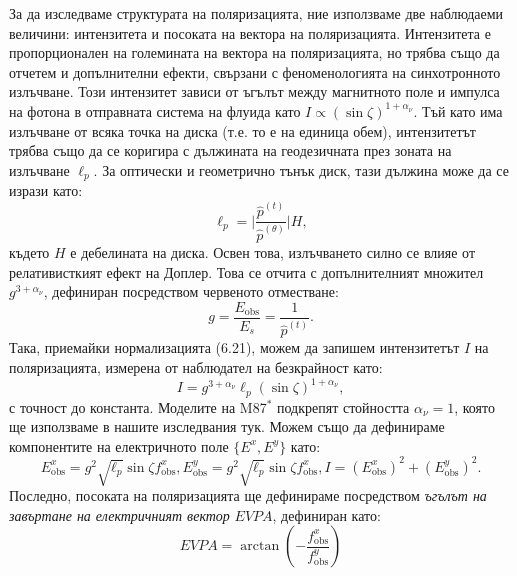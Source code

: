 За да изследваме структурата на поляризацията, ние използваме две наблюдаеми величини: интензитета и посоката на вектора на поляризацията. Интензитета е пропорционален на големината на вектора на поляризацията, но трябва също да отчетем и допълнителни ефекти, свързани с феноменологията на синхотронното излъчване. Този интензитет зависи от ъгълът между магнитното поле и импулса на фотона в отправната система на флуида като $I\propto(\sin\zeta)^{1 + \alpha_\nu}$. Тъй като има излъчване от всяка точка на диска (т.е. то е на единица обем), интензитетът трябва също да се коригира с дължината на геодезичната през зоната на излъчване $\ell_p$. За оптически и геометрично тънък диск, тази дължина може да се изрази като:
\begin{equation}
	\ell_p = \bigg\vert\frac{\hat{p}^{(t)}}{\hat{p}^{(\theta)}}\bigg\vert H,
\end{equation}
където $H$ е дебелината на диска. Освен това, излъчването силно се влияе от релативисткият ефект на Доплер. Това се отчита с допълнителният множител $g^{3 + \alpha_\nu}$, дефиниран посредством червеното отместване:
\begin{equation}
	g = \frac{E_\text{obs}}{E_s} = \frac{1}{\hat{p}^{(t)}}.
\end{equation}
Така, приемайки нормализацията (6.21), можем да запишем интензитетът $I$ на поляризацията, измерена от наблюдател на безкрайност като:
\begin{equation}
	I = g^{3 + \alpha_\nu}\ell_p(\sin\zeta)^{1 + \alpha_\nu},
\end{equation}
с точност до константа. Моделите на M87$^*$ подкрепят стойността $\alpha_\nu = 1$, която ще използваме в нашите изследвания тук. Можем също да дефинираме компонентите на електричното поле $\{E^x, E^y\}$ като:
\begin{subequations}
	\begin{equation}
		E^x_{\text{obs}} = g^2\sqrt{\ell_p}\sin\zeta f^x_\text{obs},
	\end{equation}
	\begin{equation}
		E^y_\text{obs} = g^2\sqrt{\ell_p}\sin\zeta f^x_\text{obs},
	\end{equation}
	\begin{equation}
		I = (E^x_\text{obs})^2 + (E^y_\text{obs})^2.
	\end{equation}
\end{subequations}
Последно, посоката на поляризацията ще дефинираме посредством \emph{ъгълът на завъртане на електричният вектор} $EVPA$, дефиниран като:
\begin{equation}
	EVPA = \arctan\left(-\frac{f^x_\text{obs}}{f^y_\text{obs}}\right)
\end{equation}

